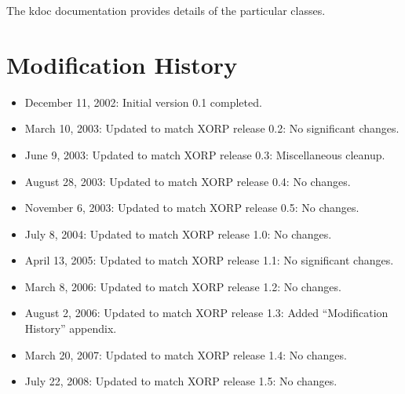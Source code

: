 \documentclass[11pt]{article}
\begin{document}
The kdoc documentation provides details of the particular classes.

\appendix
\section{Modification History}

\begin{itemize}

  \item December 11, 2002: Initial version 0.1 completed.

  \item March 10, 2003: Updated to match XORP release 0.2:
   No significant changes.

  \item June 9, 2003: Updated to match XORP release 0.3:
   Miscellaneous cleanup.

  \item August 28, 2003: Updated to match XORP release 0.4:
   No changes.

  \item November 6, 2003: Updated to match XORP release 0.5:
   No changes.

  \item July 8, 2004: Updated to match XORP release 1.0:
   No changes.

  \item April 13, 2005: Updated to match XORP release 1.1:
   No significant changes.

  \item March 8, 2006: Updated to match XORP release 1.2:
   No changes.

  \item August 2, 2006: Updated to match XORP release 1.3:
   Added ``Modification History'' appendix.

  \item March 20, 2007: Updated to match XORP release 1.4:
   No changes.

  \item July 22, 2008: Updated to match XORP release 1.5:
   No changes.

\end{itemize}




\end{document}
